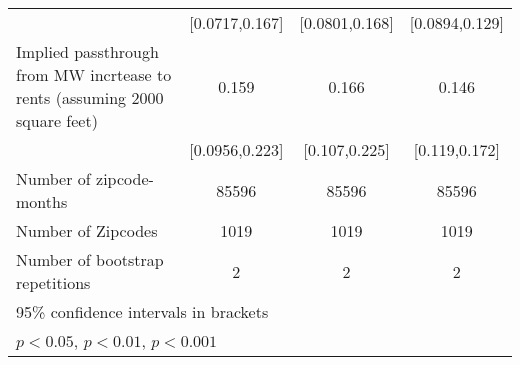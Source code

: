 {\begin{tabular}{l*{3}{c}}
            &        [0.0717,0.167]         &        [0.0801,0.168]         &        [0.0894,0.129]         \\
[1em]
Implied passthrough from MW incrtease to rents (assuming 2000 square feet)&                 0.159\sym{***}&                 0.166\sym{***}&                 0.146\sym{***}\\
            &        [0.0956,0.223]         &         [0.107,0.225]         &         [0.119,0.172]         \\
\hline
Number of zipcode-months&                 85596         &                 85596         &                 85596         \\
Number of Zipcodes&                  1019         &                  1019         &                  1019         \\
Number of bootstrap repetitions&                     2         &                     2         &                     2         \\
\hline\hline
\multicolumn{4}{l}{\footnotesize 95\% confidence intervals in brackets}\\
\multicolumn{4}{l}{\footnotesize \sym{*} \(p<0.05\), \sym{**} \(p<0.01\), \sym{***} \(p<0.001\)}\\
\end{tabular}
}

